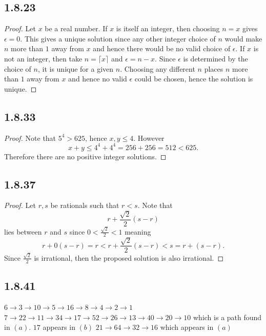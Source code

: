 \documentclass[12pt,titlepage]{extarticle}
\begin{document}
\subsection*{1.8.23}
\begin{proof}
    Let $x$ be a real number. If $x$ is itself an integer, then choosing $n = x$ gives $\epsilon = 0$. This gives a unique solution since any other integer choice of $n$ would make $n$ more than $1$ away from $x$ and hence there would be no valid choice of $\epsilon$.
    If $x$ is not an integer, then take $n = \lceil x \rceil$ and $\epsilon = n - x$. Since $\epsilon$ is determined by the choice of $n$, it is unique for a given $n$. Choosing any different $n$ places $n$ more than $1$ away from $x$ and hence no valid $\epsilon$ could be chosen, hence the solution is unique.
\end{proof}

\subsection*{1.8.33}
\begin{proof}
    Note that $5^4 > 625$, hence $x,y \leq 4$. However
    \[
        x + y \leq 4^4 + 4^4 = 256 + 256 = 512 < 625
    .\]
    Therefore there are no positive integer solutions.
\end{proof}

\subsection*{1.8.37}
\begin{proof}
    Let $r,s$ be rationals such that $r < s$. Note that
    \[
        r + \frac{\sqrt{2}}{2} (s-r)
    \]
    lies between $r$ and $s$ since $0 < \frac{\sqrt{2}}{2} < 1$ meaning 
    \[
        r + 0(s-r) = r < r + \frac{\sqrt{2}}{2} (s-r) < s = r + (s - r)
    .\]
    Since $\frac{\sqrt{2}}{2}$ is irrational, then the proposed solution is also irrational.
\end{proof}

\subsection*{1.8.41}
\begin{tasks}
    \task $6 \to 3 \to 10 \to 5 \to 16 \to 8 \to 4 \to 2 \to 1$
    \task $7 \to 22 \to 11 \to 34 \to 17 \to 52 \to 26 \to 13 \to 40 \to 20 \to 10$ which is a path found in $(a)$.
    \task $17$ appears in $(b)$
    \task $21 \to 64 \to 32 \to 16$ which appears in $(a)$
\end{tasks}
\end{document}
